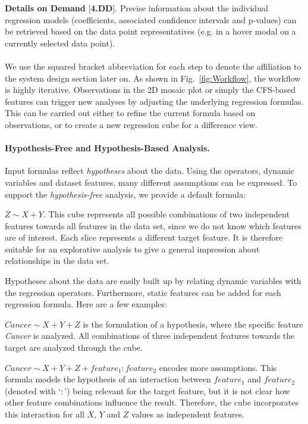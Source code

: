 \documentclass[journal]{style/vgtc} 			          %
\begin{document}
\textbf{Details on Demand} [\textbf{4.DD}]. Precise information about the individual regression models (coefficients, associated confidence intervals and p-values) can be retrieved based on the data point representatives (e.g. in a hover modal on a currently selected data point).
\\\\
We use the squared bracket abbreviation for each step to denote the affiliation to the system design section later on.
As shown in Fig.~\ref{fig:Workflow}, the workflow is highly iterative.
Observations in the 2D mosaic plot or simply the CFS-based features can trigger new analyses by adjusting the underlying regression formulas.
This can be carried out either to refine the current formula based on observations, or to create a new regression cube for a difference view.
\paragraph{Hypothesis-Free and Hypothesis-Based Analysis.}
Input formulas reflect \emph{hypotheses} about the data.
Using the operators, dynamic variables and dataset features, many different assumptions can be expressed.
To support the \emph{hypothesis-free} analysis, we provide a default formula:

$Z \sim X + Y$.
This cube represents all possible combinations of two independent features towards all features in the data set, since we do not know which features are of interest.
Each slice represents a different target feature.
It is therefore suitable for an explorative analysis to give a general impression about relationships in the data set.

Hypotheses about the data are easily built up by relating dynamic variables with the regression operators.
Furthermore, static features can be added for each regression formula.
Here are a few examples:

$Cancer \sim X + Y + Z$ is the formulation of a hypothesis, where the specific feature \textit{Cancer} is analyzed.
All combinations of three independent features towards the target are analyzed through the cube.

$Cancer \sim X + Y + Z + feature_1:feature_2$ encodes more assumptions.
This formula models the hypothesis of an interaction between $feature_1$ and $feature_2$ (denoted with `$:$') being relevant for the target feature, but it is not clear how other feature combinations influence the result.
Therefore, the cube incorporates this interaction for all $X$, $Y$ and $Z$ values as independent features.
\end{document}

